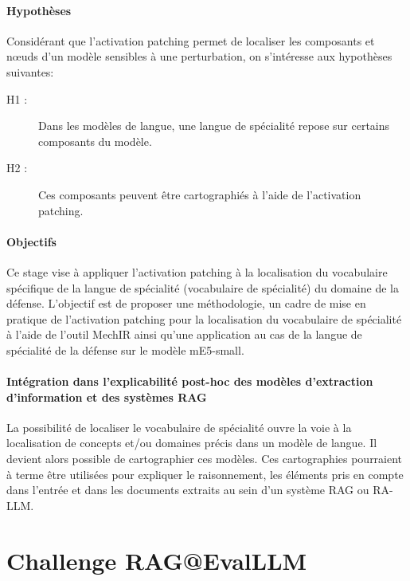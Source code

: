 \paragraph{Hypothèses} Considérant que l'activation patching permet de localiser les composants et nœuds d'un modèle sensibles à une perturbation, on s'intéresse aux hypothèses suivantes:

\begin{description}
    \item[H1 : ] Dans les modèles de langue, une langue de spécialité repose sur certains composants du modèle.
    \item[H2 : ] Ces composants peuvent être cartographiés à l'aide de l'activation patching.
\end{description}

\paragraph{Objectifs} Ce stage vise à appliquer l'activation patching à la localisation du vocabulaire spécifique de la langue de spécialité (vocabulaire de spécialité) du domaine de la défense. L'objectif est de proposer une méthodologie, un cadre de mise en pratique de l'activation patching pour la localisation du vocabulaire de spécialité à l'aide de l'outil MechIR ainsi qu'une application au cas de la langue de spécialité de la défense sur le modèle mE5-small.

\paragraph{Intégration dans l'explicabilité post-hoc des modèles d'extraction d'information et des systèmes RAG} La possibilité de localiser le vocabulaire de spécialité ouvre la voie à la localisation de concepts et/ou domaines précis dans un modèle de langue. Il devient alors possible de cartographier ces modèles. Ces cartographies pourraient à terme être utilisées pour expliquer le raisonnement, les éléments pris en compte dans l'entrée et dans les documents extraits au sein d'un système RAG ou RA-LLM. %



\section{Challenge RAG@EvalLLM}

